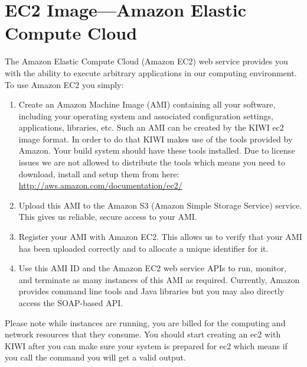 \chapter{EC2 Image---Amazon Elastic Compute Cloud}
\label{chapter:ec2}
\minitoc

The Amazon Elastic Compute Cloud (Amazon EC2) web service provides you
with the ability to execute arbitrary applications in our computing
environment. To use Amazon EC2 you simply:

\begin{enumerate}
\item Create an Amazon Machine Image (AMI)%
      containing all your software,
      including your operating system and associated configuration settings,
      applications, libraries, etc. Such an AMI can be created by the KIWI
      ec2 image format. In order to do that KIWI makes use of the tools
      provided by Amazon. Your build system should have these tools
      installed. Due to license issues we are not allowed to distribute
      the tools which means you need to download, install and setup
      them from here:\\
      \url{http://aws.amazon.com/documentation/ec2/}
\item Upload this AMI to the Amazon S3 (Amazon Simple Storage Service)
      service. This gives us reliable, secure access to your AMI.
\item Register your AMI with Amazon EC2. This allows us to verify that your
      AMI has been uploaded correctly and to allocate a unique identifier
      for it.
\item Use this AMI ID and the Amazon EC2 web service APIs to run, monitor,
      and terminate as many instances of this AMI as required. Currently,
      Amazon provides command line tools and Java libraries but you may also
      directly access the SOAP-based API.
\end{enumerate}

Please note while instances are running, you are billed for the
computing and network resources that they consume.
You should start creating an ec2 with KIWI after you can make sure
your system is prepared for ec2 which means if you call the command
  you will get a valid output.

